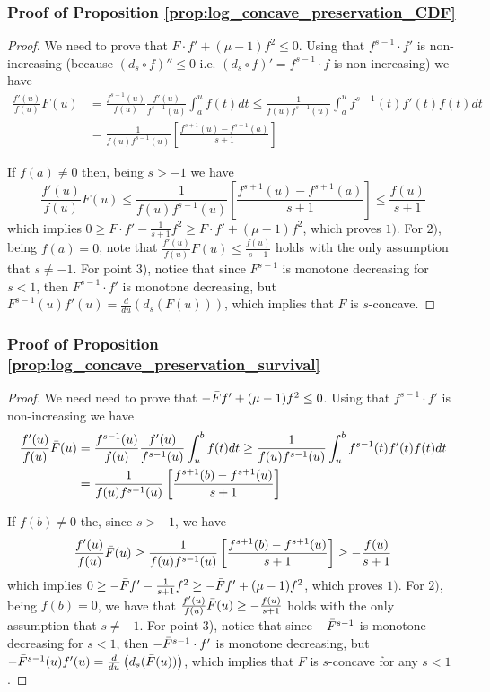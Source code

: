 \documentclass{article} %
\begin{document}
\subsubsection{Proof of Proposition \ref{prop:log_concave_preservation_CDF}}\label{proof:prop:log_concave_preservation_CDF}
\begin{proof}
We need to prove that $F \cdot f'+(\mu-1)f^2 \leq 0$. Using that $f^{s-1}\cdot f'$ is non-increasing (because $(d_s \circ f)''\leq 0$ i.e. $(d_s \circ f)' =f^{s-1}\cdot f$ is non-increasing) we have
\begin{align*}
\frac{f'(u)}{f(u)}F(u) &= \frac{f^{s-1}(u)}{f(u)}\frac{f'(u)}{f^{s-1}(u)}\int_a^{u}f(t) dt \leq \frac{1}{f(u)f^{s-1}(u)}\int_a^{u} f^{s-1}(t)f'(t)f(t) dt \\
&= \frac{1}{f(u)f^{s-1}(u)} \left[ \frac{f^{s+1}(u)-f^{s+1}(a)}{s +1}\right]
\end{align*}

If $f(a) \neq 0$ then, being $s>-1$ we have 
$$
\frac{f'(u)}{f(u)}F(u) \leq \frac{1}{f(u)f^{s-1}(u)} \left[ \frac{f^{s+1}(u)-f^{s+1}(a)}{s +1}\right] \leq \frac{f(u)}{s +1}
$$
which implies $0 \geq F \cdot f'-\frac{1}{s+1}f^2 \geq F \cdot f'+(\mu-1)f^2$, which proves $1)$. For $2)$, being $f(a)=0$, note that $\frac{f'(u)}{f(u)}F(u) \leq \frac{f(u)}{s +1}$ holds with the only assumption that $s \neq -1$. For point 3), notice that since $F^{s -1}$ is monotone decreasing for $s <1$, then $F^{s -1}\cdot f'$ is monotone decreasing, but $F^{s -1}(u) f'(u) = \frac{d}{du}\left(d_{s} (F(u)) \right)$, which implies that $F$ is $s$-concave.
\end{proof}

\subsubsection{Proof of Proposition \ref{prop:log_concave_preservation_survival}}\label{proof:prop:log_concave_preservation_survival}
\begin{proof}
We need need to prove that $-\Bar{F}f'+(\mu-1)f^2\leq 0$. Using that $f^{s-1}\cdot f'$ is non-increasing we have
\begin{align*}
\frac{f'(u)}{f(u)}\Bar{F}(u) &= \frac{f^{s-1}(u)}{f(u)}\frac{f'(u)}{f^{s-1}(u)}\int_u^{b}f(t) dt \geq \frac{1}{f(u)f^{s-1}(u)}\int_u^{b} f^{s-1}(t)f'(t)f(t) dt \\
&= \frac{1}{f(u)f^{s-1}(u)} \left[ \frac{f^{s+1}(b)-f^{s+1}(u)}{s +1}\right]
\end{align*}

If $f(b) \neq 0$ the, since $s > -1$, we have 
$$
\frac{f'(u)}{f(u)}\Bar{F}(u) \geq \frac{1}{f(u)f^{s-1}(u)} \left[ \frac{f^{s+1}(b)-f^{s+1}(u)}{s +1}\right] \geq -\frac{f(u)}{s +1}
$$ 
which implies $0 \geq -\Bar{F}f'-\frac{1}{s+1}f^2 \geq -\Bar{F}f'+(\mu-1)f^2$, which proves $1)$. For $2)$, being $f(b)=0$, we have that $\frac{f'(u)}{f(u)}\Bar{F}(u) \geq -\frac{f(u)}{s +1}$ holds with the only assumption that $s \neq -1$. For point 3), notice that since $-\Bar{F}^{s -1}$ is monotone decreasing for $s <1$, then $-\Bar{F}^{s -1}\cdot f'$ is monotone decreasing, but $-\Bar{F}^{s -1}(u) f'(u) = \frac{d}{du}\left(d_{s} (\Bar{F}(u)) \right)$, which implies that $F$ is $s$-concave for any $s <1$.
\end{proof}
\end{document}
